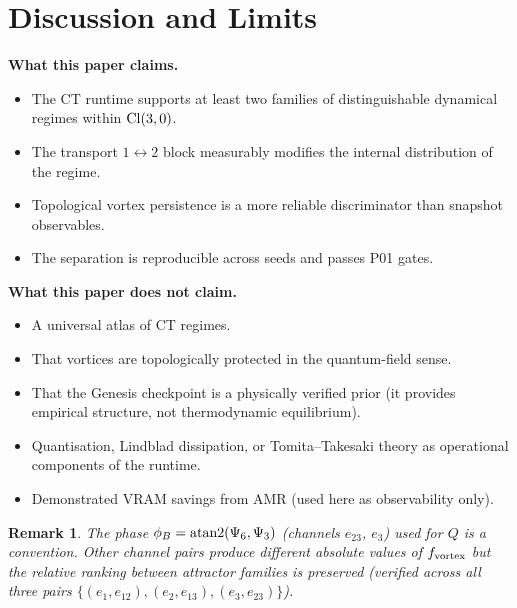 \documentclass[11pt,a4paper]{article}
\newtheorem{remark}{Remark}
\begin{document}
\section{Discussion and Limits}

\noindent\textbf{What this paper claims.}\par
\begin{itemize}
  \item The CT runtime supports at least two families of distinguishable
        dynamical regimes within $\mathrm{Cl}(3,0)$.
  \item The transport $1\leftrightarrow2$ block measurably modifies the
        internal distribution of the regime.
  \item Topological vortex persistence is a more reliable discriminator
        than snapshot observables.
  \item The separation is reproducible across seeds and passes P01 gates.
\end{itemize}

\noindent\textbf{What this paper does not claim.}\par
\begin{itemize}
  \item A universal atlas of CT regimes.
  \item That vortices are topologically protected in the quantum-field sense.
  \item That the Genesis checkpoint is a physically verified prior
        (it provides empirical structure, not thermodynamic equilibrium).
  \item Quantisation, Lindblad dissipation, or Tomita--Takesaki theory
        as operational components of the runtime.
  \item Demonstrated VRAM savings from AMR (used here as observability
        only).
\end{itemize}

\begin{remark}
The phase $\phi_B = \operatorname{atan2}(\Psi_6, \Psi_3)$
(channels $e_{23}$, $e_3$) used for $Q$ is a convention.
Other channel pairs produce different absolute values of $f_{\mathrm{vortex}}$
but the relative ranking between attractor families is preserved
(verified across all three pairs $\{(e_1,e_{12}),(e_2,e_{13}),(e_3,e_{23})\}$).
\end{remark}

\end{document}

